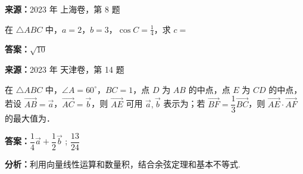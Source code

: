 \begin{question}[points=5]
\textbf{来源：}2023 年 上海卷，第 8 题\par
在 $\triangle ABC$ 中，$a=2$，$b=3$，$\cos C = \frac{1}{4}$，求 $c=$
\fillin[{$\sqrt{10}$}]
\begin{solution}
\textbf{答案：}$\sqrt{10}$
\end{solution}
\end{question}

\begin{question}[points=5]
\textbf{来源：}2023 年 天津卷，第 14 题\par
在 $\triangle ABC$ 中，$\angle A = 60^\circ$，$BC = 1$，点 $D$ 为 $AB$ 的中点，点 $E$ 为 $CD$ 的中点，若设 $\overrightarrow{AB} = \vec{a}$，$\overrightarrow{AC} = \vec{b}$，则 $\overrightarrow{AE}$ 可用 $\vec{a}, \vec{b}$ 表示为；若 $\overrightarrow{BF} = \dfrac{1}{3} \overrightarrow{BC}$，则 $\overrightarrow{AE} \cdot \overrightarrow{AF}$ 的最大值为．
\begin{solution}
\textbf{答案：}$\dfrac{1}{4}\vec{a} + \dfrac{1}{2}\vec{b}$ ; $\dfrac{13}{24}$

\textbf{分析：}利用向量线性运算和数量积，结合余弦定理和基本不等式.


\end{solution}
\end{question}
